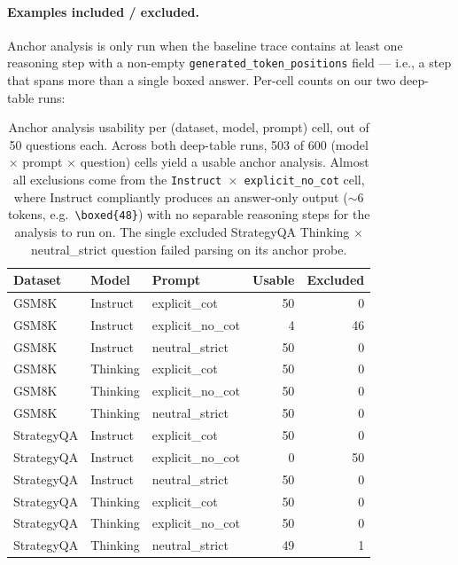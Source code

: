 \documentclass{article}
\theoremstyle{plain}
\theoremstyle{definition}
\theoremstyle{remark}
\begin{document}
\paragraph{Examples included / excluded.}
Anchor analysis is only run when the baseline trace contains at
least one reasoning step with a non-empty
\texttt{generated\_token\_positions} field --- i.e., a step that
spans more than a single boxed answer. Per-cell counts on our two
deep-table runs:

\begin{table}[!htbp]
\centering
\small
\setlength{\tabcolsep}{4pt}
\begin{tabular}{@{}lllrr@{}}
\toprule
Dataset & Model & Prompt & Usable & Excluded \\
\midrule
GSM8K       & Instruct & explicit\_cot     & 50 & 0 \\
GSM8K       & Instruct & explicit\_no\_cot &  4 & 46 \\
GSM8K       & Instruct & neutral\_strict   & 50 & 0 \\
GSM8K       & Thinking & explicit\_cot     & 50 & 0 \\
GSM8K       & Thinking & explicit\_no\_cot & 50 & 0 \\
GSM8K       & Thinking & neutral\_strict   & 50 & 0 \\
\midrule
StrategyQA  & Instruct & explicit\_cot     & 50 & 0 \\
StrategyQA  & Instruct & explicit\_no\_cot &  0 & 50 \\
StrategyQA  & Instruct & neutral\_strict   & 50 & 0 \\
StrategyQA  & Thinking & explicit\_cot     & 50 & 0 \\
StrategyQA  & Thinking & explicit\_no\_cot & 50 & 0 \\
StrategyQA  & Thinking & neutral\_strict   & 49 & 1 \\
\bottomrule
\end{tabular}
\caption{Anchor analysis usability per (dataset, model, prompt)
cell, out of 50 questions each. Across both deep-table runs, 503 of
600 (model $\times$ prompt $\times$ question) cells yield a usable
anchor analysis. Almost all exclusions come from the
\texttt{Instruct $\times$ explicit\_no\_cot} cell, where Instruct
compliantly produces an answer-only output ($\sim$6 tokens, e.g.\
\texttt{\textbackslash boxed\{48\}}) with no separable reasoning steps
for the analysis to run on. The single excluded StrategyQA Thinking
$\times$ neutral\_strict question failed parsing on its anchor
probe.}
\label{tab:anchor-coverage}
\end{table}
\end{document}
